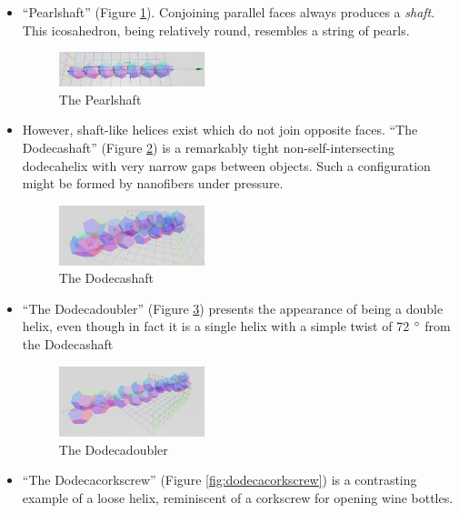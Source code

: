 \documentclass[11pt]{article}
\begin{document}
{\begin{itemize}
\item ``Pearlshaft'' (Figure \ref{fig:pearlshaft}). Conjoining parallel faces always produces a {\em shaft}. This icosahedron, being relatively round,
  resembles a string of pearls.
\begin{figure}
     \centering
     \includegraphics[width=0.40\textwidth]{figures/PearlShaft.png}
     \caption{The Pearlshaft}
  \label{fig:pearlshaft}
\end{figure}

\item However, shaft-like helices exist which do not join opposite faces. ``The Dodecashaft'' (Figure \ref{fig:dodecashaft}) is a remarkably tight
  non-self-intersecting dodecahelix with very narrow gaps between objects.
  Such a configuration
  might be formed by nanofibers under pressure.
\begin{figure}
     \centering
     \includegraphics[width=0.40\textwidth]{figures/Dodecashaft.png}
     \caption{The Dodecashaft}
  \label{fig:dodecashaft}
\end{figure}
\item ``The Dodecadoubler'' (Figure \ref{fig:dodecadoubler}) presents the appearance of being a double helix, even though in fact it is a single helix with
  a simple twist of 72 $\degree$ from the Dodecashaft
\begin{figure}
     \centering
     \includegraphics[width=0.40\textwidth]{figures/Dodecadoubler.png}
     \caption{The Dodecadoubler}
  \label{fig:dodecadoubler}
\end{figure}
\item ``The Dodecacorkscrew'' (Figure \ref{fig:dodecacorkscrew}) is a contrasting example of a loose helix, reminiscent of a corkscrew for opening wine bottles.
\begin{figure}

\end{figure}
\end{itemize}}
\end{document}
